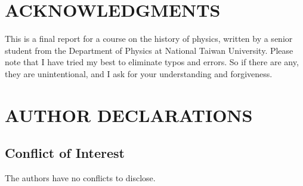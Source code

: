 \documentclass[a4paper, 12pt, oneside, onecolumn]{article}
\begin{document}
\section*{ACKNOWLEDGMENTS}
This is a final report for a course on the history of physics, written by a senior student from the Department of Physics at National Taiwan University. Please note that I have tried my best to eliminate typos and errors. So if there are any, they are unintentional, and I ask for your understanding and forgiveness.
\section*{AUTHOR DECLARATIONS}
\subsection*{Conflict of Interest}
The authors have no conflicts to disclose.
\newpage
\nocite{*}


\end{document}
